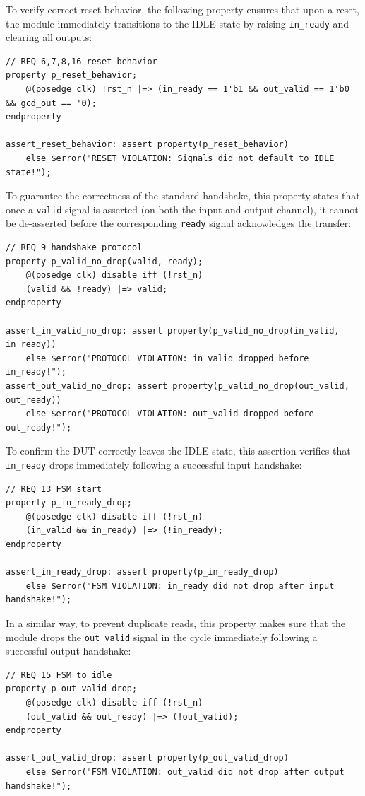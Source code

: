 To verify correct reset behavior, the following property ensures that upon a reset, the module immediately transitions to the IDLE state by raising \texttt{in\_ready} and clearing all outputs:
\begin{verbatim}
// REQ 6,7,8,16 reset behavior
property p_reset_behavior;
    @(posedge clk) !rst_n |=> (in_ready == 1'b1 && out_valid == 1'b0 && gcd_out == '0);
endproperty

assert_reset_behavior: assert property(p_reset_behavior) 
    else $error("RESET VIOLATION: Signals did not default to IDLE state!");
\end{verbatim}

To guarantee the correctness of the standard handshake, this property states that once a \texttt{valid} signal is asserted (on both the input and output channel), it cannot be de-asserted before the corresponding \texttt{ready} signal acknowledges the transfer:
\begin{verbatim}
// REQ 9 handshake protocol
property p_valid_no_drop(valid, ready);
    @(posedge clk) disable iff (!rst_n)
    (valid && !ready) |=> valid;
endproperty

assert_in_valid_no_drop: assert property(p_valid_no_drop(in_valid, in_ready)) 
    else $error("PROTOCOL VIOLATION: in_valid dropped before in_ready!");
assert_out_valid_no_drop: assert property(p_valid_no_drop(out_valid, out_ready))
    else $error("PROTOCOL VIOLATION: out_valid dropped before out_ready!");
\end{verbatim}

To confirm the DUT correctly leaves the IDLE state, this assertion verifies that \texttt{in\_ready} drops immediately following a successful input handshake:
\begin{verbatim}
// REQ 13 FSM start
property p_in_ready_drop;
    @(posedge clk) disable iff (!rst_n)
    (in_valid && in_ready) |=> (!in_ready);
endproperty

assert_in_ready_drop: assert property(p_in_ready_drop)
    else $error("FSM VIOLATION: in_ready did not drop after input handshake!");
\end{verbatim}

In a similar way, to prevent duplicate reads, this property makes sure that the module drops the \texttt{out\_valid} signal in the cycle immediately following a successful output handshake:
\begin{verbatim}
// REQ 15 FSM to idle
property p_out_valid_drop;
    @(posedge clk) disable iff (!rst_n)
    (out_valid && out_ready) |=> (!out_valid);
endproperty

assert_out_valid_drop: assert property(p_out_valid_drop)
    else $error("FSM VIOLATION: out_valid did not drop after output handshake!");
\end{verbatim}

